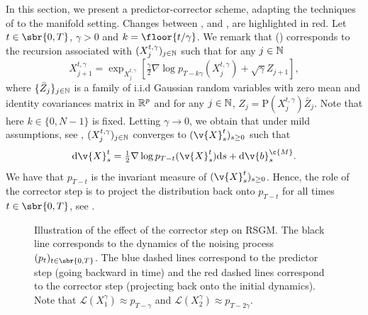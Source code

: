 In this section, we present a predictor-corrector scheme, adapting the techniques of \textcite{allgower2012numerical,song2020score} to the manifold setting.
Changes between ,  and ,  are highlighted in red.
Let $t \in \sbr{0,T}$, $\gamma >0$ and $k = \floor{t / \gamma}$.
We remark that  () corresponds to the recursion associated with $(X_j^{t,\gamma})_{j \in \mathbb{N}}$ such that for any $j \in \mathbb{N}$ \begin{equation} X_{j+1}^{t,\gamma} = \exp_{X_j^{t,\gamma}}[\tfrac{\gamma}{2} \nabla \log p_{T-k\gamma}(X_j^{t,\gamma}) + \sqrt{\gamma} Z_{j+1}] , \end{equation} where $\{\bar{Z}_j\}_{j \in \mathbb{N}}$ is a family of i.i.d Gaussian random variables with zero mean and identity covariances matrix in $\mathbb{R}^p$ and for any $j \in \mathbb{N}$, $Z_j = \mathrm{P}(X_j^{t,\gamma}) \bar{Z}_j$.
Note that here $k \in \{0, N-1\}$ is fixed.
Letting $\gamma \to 0$, we obtain that under mild assumptions, see \cite[Theorem 3.1]{kuwada2012convergence}, $(X_j^{t, \gamma})_{j \in \mathbb{N}}$ converges to $(\v{X}_s^t)_{s \geq 0}$ such that \begin{equation} \mathrm{d} \v{X}_s^t = \tfrac{1}{2} \nabla \log p_{T-t}(\v{X}_s^t) \mathrm{d} s + \mathrm{d} \v{b}_s^\c{M} .
\end{equation}
We have that $p_{T-t}$ is the invariant measure of $(\v{X}_s^t)_{s \geq 0}$.
Hence, the role of the corrector step is to project the distribution back onto $p_{T-t}$ for all times $t \in \sbr{0,T}$, see .
\begin{figure}[htb]
	\centering
	\caption{Illustration of the effect of the corrector step on RSGM.
		The black line corresponds to the dynamics of the noising process $(p_t)_{t \in \sbr{0,T}}$.
		The blue dashed lines correspond to the predictor step (going backward in time) and the red dashed lines correspond to the corrector step (projecting back onto the initial dynamics).
		Note that $\mathcal{L}(X_1^\gamma) \approx p_{T- \gamma}$ and $\mathcal{L}(X_2^\gamma) \approx p_{T- 2\gamma}$.
	}
	\label{fig:illustration_pred_correc}
\end{figure}

